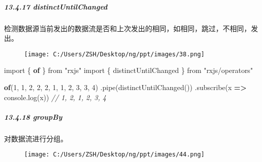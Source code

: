 \documentclass[
]{article}
\newenvironment{Shaded}{}{}
\newcommand{\BuiltInTok}[1]{#1}
\newcommand{\CommentTok}[1]{\textcolor[rgb]{0.38,0.63,0.69}{\textit{#1}}}
\newcommand{\DecValTok}[1]{\textcolor[rgb]{0.25,0.63,0.44}{#1}}
\newcommand{\FunctionTok}[1]{\textcolor[rgb]{0.02,0.16,0.49}{#1}}
\newcommand{\ImportTok}[1]{#1}
\newcommand{\KeywordTok}[1]{\textcolor[rgb]{0.00,0.44,0.13}{\textbf{#1}}}
\newcommand{\NormalTok}[1]{#1}
\newcommand{\OperatorTok}[1]{\textcolor[rgb]{0.40,0.40,0.40}{#1}}
\newcommand{\StringTok}[1]{\textcolor[rgb]{0.25,0.44,0.63}{#1}}
\begin{document}
\hypertarget{13417-distinctuntilchanged}{%
\subparagraph{13.4.17
distinctUntilChanged}\label{13417-distinctuntilchanged}}

检测数据源当前发出的数据流是否和上次发出的相同，如相同，跳过，不相同，发出。

\begin{figure}
\centering
\texttt{[image: C:/Users/ZSH/Desktop/ng/ppt/images/38.png]}
\caption{}
\end{figure}

\begin{Shaded}
\begin{Highlighting}[]
\ImportTok{import}\NormalTok{ \{ }\KeywordTok{of}\NormalTok{ \} }\ImportTok{from} \StringTok{"rxjs"}
\ImportTok{import}\NormalTok{ \{ distinctUntilChanged \} }\ImportTok{from} \StringTok{"rxjs/operators"}

\KeywordTok{of}\NormalTok{(}\DecValTok{1}\OperatorTok{,} \DecValTok{1}\OperatorTok{,} \DecValTok{2}\OperatorTok{,} \DecValTok{2}\OperatorTok{,} \DecValTok{2}\OperatorTok{,} \DecValTok{1}\OperatorTok{,} \DecValTok{1}\OperatorTok{,} \DecValTok{2}\OperatorTok{,} \DecValTok{3}\OperatorTok{,} \DecValTok{3}\OperatorTok{,} \DecValTok{4}\NormalTok{)}
  \OperatorTok{.}\FunctionTok{pipe}\NormalTok{(}\FunctionTok{distinctUntilChanged}\NormalTok{())}
  \OperatorTok{.}\FunctionTok{subscribe}\NormalTok{(x }\KeywordTok{=\textgreater{}} \BuiltInTok{console}\OperatorTok{.}\FunctionTok{log}\NormalTok{(x)) }\CommentTok{// 1, 2, 1, 2, 3, 4}
\end{Highlighting}
\end{Shaded}

\hypertarget{13418-groupby}{%
\subparagraph{13.4.18 groupBy}\label{13418-groupby}}

对数据流进行分组。

\begin{figure}
\centering
\texttt{[image: C:/Users/ZSH/Desktop/ng/ppt/images/44.png]}
\caption{}
\end{figure}
\end{document}
